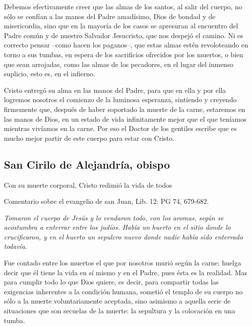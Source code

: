 			\begin{body}Debemos efectivamente creer que las almas de los santos, al salir del cuerpo, no sólo se confían a las manos del Padre amadísimo, Dios de bondad y de misericordia, sino que en la mayoría de los casos se apresuran al encuentro del Padre común y de nuestro Salvador Jesucristo, que nos despejó el camino. Ni es correcto pensar –como hacen los paganos–, que estas almas estén revoloteando en torno a sus tumbas, en espera de los sacrificios ofrecidos por los muertos, o bien que sean arrojadas, como las almas de los pecadores, en el lugar del inmenso suplicio, esto es, en el infierno.\end{body}
			
			\begin{body}Cristo entregó su alma en las manos del Padre, para que en ella y por ella logremos nosotros el comienzo de la luminosa esperanza, sintiendo y creyendo firmemente que, después de haber soportado la muerte de la carne, estaremos en las manos de Dios, en un estado de vida infinitamente mejor que el que teníamos mientras vivíamos en la carne. Por eso el Doctor de los gentiles escribe que es mucho mejor partir de este cuerpo para estar con Cristo.\end{body}
			
			\subsection{San Cirilo de Alejandría, obispo}
			
			\begin{patertheme}Con su muerte corporal, Cristo redimió la vida de todos\end{patertheme}
			
			\begin{patersource}Comentario sobre el evangelio de san Juan, Lib. 12: PG 74, 679-682.\end{patersource}
			
			\begin{body}\textit{Tomaron el cuerpo de Jesús y lo vendaron todo, con los aromas, según se acostumbra a enterrar entre los judíos. Había un huerto en el sitio donde lo crucificaron, y en el huerto un sepulcro nuevo donde nadie había sido enterrado todavía.}\end{body}
			
			\begin{body}Fue contado entre los muertos el que por nosotros murió según la carne; huelga decir que él tiene la vida en sí mismo y en el Padre, pues ésta es la realidad. Mas para cumplir todo lo que Dios quiere, es decir, para compartir todas las exigencias inherentes a la condición humana, sometió el templo de su cuerpo no sólo a la muerte voluntariamente aceptada, sino asimismo a aquella serie de situaciones que son secuelas de la muerte: la sepultura y la colocación en una tumba.\end{body}
			
